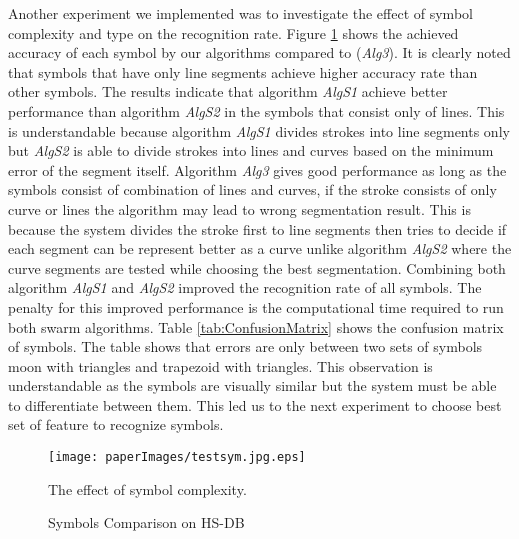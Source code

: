 
Another experiment we implemented was to investigate the effect of symbol complexity and type on the recognition rate. Figure \ref{fig:test2} shows the achieved accuracy of each symbol by our algorithms compared to \cite{earlyprocess} (\textsl{Alg3}). It is clearly noted that symbols that have only line segments achieve higher accuracy rate than other symbols.  The results indicate that algorithm \textsl{AlgS1} achieve better performance than algorithm \textsl{AlgS2} in the symbols that consist only of lines. This is understandable because algorithm \textsl{AlgS1} divides strokes into line segments only but \textsl{AlgS2} is able to divide strokes into lines and curves based on the minimum error of the segment itself. Algorithm \textsl{Alg3} gives good performance as long as the symbols consist of combination of lines and curves, if the stroke consists of only curve or lines the algorithm may lead to wrong segmentation result. This is because the system divides the stroke first to line segments then tries to decide if each segment can be represent better as a curve unlike algorithm \textsl{AlgS2} where the curve segments are tested while choosing the best segmentation. Combining both algorithm \textsl{AlgS1} and \textsl{AlgS2} improved the recognition rate of all symbols. The penalty for this improved performance is the computational time required to run both swarm algorithms. Table \ref{tab:ConfusionMatrix} shows the confusion matrix of symbols. The table shows that errors are only between two sets of symbols moon with triangles and trapezoid with triangles. This observation is understandable as the symbols are visually similar but the system must be able to differentiate between them. This led us to the next experiment to choose best set of feature to recognize symbols. 
 
 \begin{figure}
	\centering
		\texttt{[image: paperImages/testsym.jpg.eps]}
	\caption{Symbols Comparison on HS-DB} The effect of symbol complexity.  %
	\label{fig:test2}
\end{figure}  


